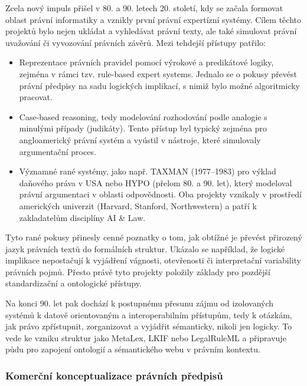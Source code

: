 Zcela nový impuls přišel v 80. a 90. letech 20. století, kdy se začala formovat oblast právní informatiky a vznikly první právní expertízní systémy. Cílem těchto projektů bylo nejen ukládat a vyhledávat právní texty, ale také simulovat právní uvažování či vyvozování právních závěrů. \cite{Mayo2013} Mezi tehdejší přístupy patřilo:
\begin{itemize}
  \item Reprezentace právních pravidel pomocí výrokové a predikátové logiky, zejména v rámci tzv. rule-based expert systems. Jednalo se o pokusy převést právní předpisy na sadu logických implikací, s nimiž bylo možné algoritmicky pracovat. \cite{Mayo2013}
  \item Case-based reasoning, tedy modelování rozhodování podle analogie s minulými případy (judikáty). Tento přístup byl typický zejména pro angloamerický právní systém a vyústil v nástroje, které simulovaly argumentační proces. \cite{Mayo2013,Rissland1987}
  \item Významné rané systémy, jako např. TAXMAN (1977–1983) pro výklad daňového práva v USA nebo HYPO (přelom 80. a 90. let), který modeloval právní argumentaci v oblasti odpovědnosti. Oba projekty vznikaly v prostředí amerických univerzit (Harvard, Stanford, Northwestern) a patří k zakladatelům disciplíny AI \& Law. \cite{McCarty1976,Rissland1987}
\end{itemize}

Tyto rané pokusy přinesly cenné poznatky o tom, jak obtížné je převést přirozený jazyk právních textů do formálních struktur. Ukázalo se například, že logické implikace nepostačují k vyjádření vágnosti, otevřenosti či interpretační variability právních pojmů. Přesto právě tyto projekty položily základy pro pozdější standardizační a ontologické přístupy. \cite{Mcculloch2006}

Na konci 90. let pak dochází k postupnému přesunu zájmu od izolovaných systémů k datově orientovaným a interoperabilním přístupům, tedy k otázkám, jak právo zpřístupnit, zorganizovat a vyjádřit sémanticky, nikoli jen logicky. To vede ke vzniku struktur jako MetaLex, LKIF nebo LegalRuleML a připravuje půdu pro zapojení ontologií a sémantického webu v právním kontextu. \cite{McCray2006,Boer2007,Athan2013,Athan2015}


\subsubsection{Komerční konceptualizace právních předpisů}
\label{komercni_konceptualizace}

